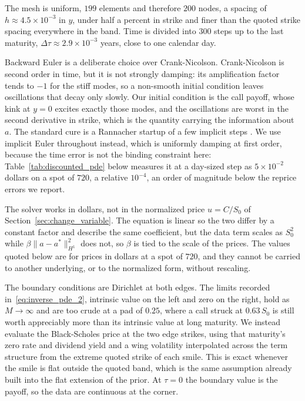 The mesh is uniform, $199$ elements and therefore $200$ nodes, a spacing of
$h \approx 4.5\times 10^{-3}$ in $y$, under half a percent in strike and finer than the quoted
strike spacing everywhere in the band. Time is divided into $300$ steps up to the last
maturity, $\Delta\tau \approx 2.9\times 10^{-3}$ years, close to one calendar day.

Backward Euler is a deliberate choice over Crank-Nicolson. Crank-Nicolson is second order in
time, but it is not strongly damping: its amplification factor tends to $-1$ for the stiff
modes, so a non-smooth initial condition leaves oscillations that decay only slowly. Our
initial condition is the call payoff, whose kink at $y = 0$ excites exactly those modes, and
the oscillations are worst in the second derivative in strike, which is the quantity carrying
the information about $a$. The standard cure is a Rannacher startup of a few implicit steps
\cite{giles_carter_crank_nicolson}. We use implicit Euler throughout instead, which is
uniformly damping at first order, because the time error is not the binding constraint here:
Table~\ref{tab:discounted_pde} below measures it at a day-sized step as
$5\times 10^{-2}$ dollars on a spot of $720$, a relative $10^{-4}$, an order of magnitude
below the reprice errors we report.

The solver works in dollars, not in the normalized price $u = C/S_0$ of
Section~\ref{sec:change_variable}. The equation is linear so the two differ by a constant
factor and describe the same coefficient, but the data term scales as $S_0^2$ while
$\beta\|a - a^*\|^2_{H^1}$ does not, so $\beta$ is tied to the scale of the prices. The values
quoted below are for prices in dollars at a spot of $720$, and they cannot be carried to
another underlying, or to the normalized form, without rescaling.

The boundary conditions are Dirichlet at both edges. The limits recorded
in~\eqref{eq:inverse_pde_2}, intrinsic value on the left and zero on the right, hold as
$M \to \infty$ and are too crude at a pad of $0.25$, where a call struck at $0.63\,S_0$ is
still worth appreciably more than its intrinsic value at long maturity. We instead evaluate
the Black-Scholes price at the two edge strikes, using that maturity's zero rate and dividend
yield and a wing volatility interpolated across the term structure from the extreme quoted
strike of each smile. This is exact whenever the smile is flat outside the quoted band, which
is the same assumption already built into the flat extension of the prior. At $\tau = 0$ the
boundary value is the payoff, so the data are continuous at the corner.

